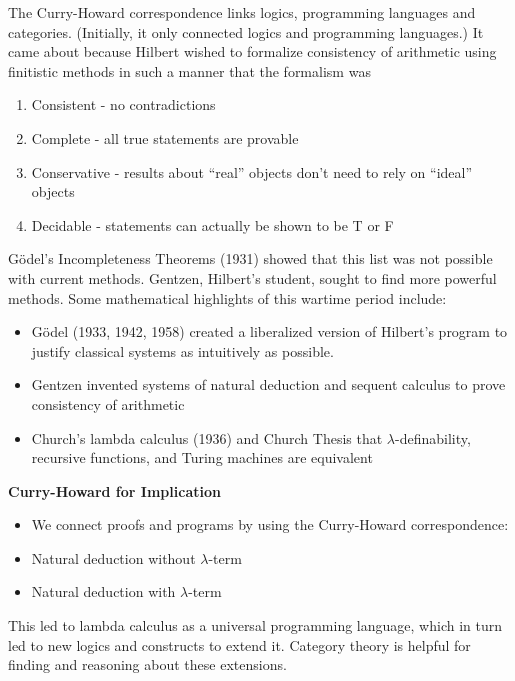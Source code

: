\documentclass[11pt]{article}
\begin{document}
The Curry-Howard correspondence links logics, programming languages and categories. (Initially, it only connected logics and programming languages.) It came about because Hilbert wished to formalize consistency of arithmetic using finitistic methods in such a manner that the formalism was
\begin{enumerate}
    \item Consistent - no contradictions
    \item Complete - all true statements are provable
    \item Conservative - results about ``real'' objects don't need to rely on ``ideal'' objects
    \item Decidable - statements can actually be shown to be T or F
\end{enumerate}
Gödel's Incompleteness Theorems (1931) showed that this list was not possible with current methods. Gentzen, Hilbert's student, sought to find more powerful methods. Some mathematical highlights of this wartime period include:
\begin{itemize}
    \item Gödel (1933, 1942, 1958) created a liberalized version of Hilbert's program to justify classical systems as intuitively as possible.
    \item Gentzen invented systems of natural deduction and sequent calculus to prove consistency of arithmetic
    \item Church's lambda calculus (1936) and Church Thesis that $\lambda$-definability, recursive functions, and Turing machines are equivalent
\end{itemize}
\noindent\textbf{Curry-Howard for Implication}
\begin{itemize}
\item We connect proofs and programs by using the Curry-Howard correspondence:
\item Natural deduction without $\lambda$-term
\item Natural deduction with $\lambda$-term
\end{itemize}
This led to lambda calculus as a universal programming language, which in turn led to new logics and constructs to extend it. Category theory is helpful for finding and reasoning about these extensions.
\end{document}
